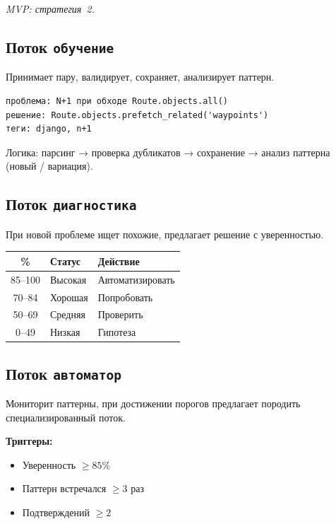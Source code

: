\documentclass[10pt, oneside]{article}
\begin{document}
\textit{MVP: стратегия~2.}

\subsection{Поток \texttt{обучение}}

Принимает пару, валидирует, сохраняет, анализирует паттерн.

\begin{lstlisting}[language={},numbers=none]
проблема: N+1 при обходе Route.objects.all()
решение: Route.objects.prefetch_related('waypoints')
теги: django, n+1
\end{lstlisting}

Логика: парсинг → проверка дубликатов → сохранение → анализ паттерна (новый / вариация).

\subsection{Поток \texttt{диагностика}}

При новой проблеме ищет похожие, предлагает решение с уверенностью.

\begin{tabular}{@{}cll@{}}
  \toprule
  \textbf{\%} & \textbf{Статус} & \textbf{Действие} \\
  \midrule
  85--100 & Высокая & Автоматизировать \\
  70--84  & Хорошая & Попробовать \\
  50--69  & Средняя & Проверить \\
  0--49   & Низкая  & Гипотеза \\
  \bottomrule
\end{tabular}

\subsection{Поток \texttt{автоматор}}

Мониторит паттерны, при достижении порогов предлагает породить специализированный поток.

\textbf{Триггеры:}
\begin{itemize}
  \item Уверенность $\geq 85\%$
  \item Паттерн встречался $\geq 3$ раз
  \item Подтверждений $\geq 2$
\end{itemize}

\end{document}
